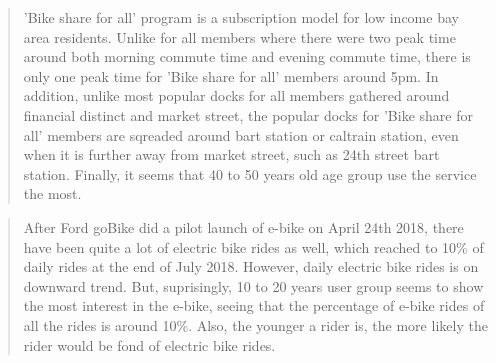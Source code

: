 \documentclass[11pt]{article}
\begin{document}
    \begin{quote}
'Bike share for all' program is a subscription model for low income bay
area residents. Unlike for all members where there were two peak time
around both morning commute time and evening commute time, there is only
one peak time for 'Bike share for all' members around 5pm. In addition,
unlike most popular docks for all members gathered around financial
distinct and market street, the popular docks for 'Bike share for all'
members are sqreaded around bart station or caltrain station, even when
it is further away from market street, such as 24th street bart station.
Finally, it seems that 40 to 50 years old age group use the service the
most.
\end{quote}

    \begin{quote}
After Ford goBike did a pilot launch of e-bike on April 24th 2018, there
have been quite a lot of electric bike rides as well, which reached to
10\% of daily rides at the end of July 2018. However, daily electric
bike rides is on downward trend. But, suprisingly, 10 to 20 years user
group seems to show the most interest in the e-bike, seeing that the
percentage of e-bike rides of all the rides is around 10\%. Also, the
younger a rider is, the more likely the rider would be fond of electric
bike rides.
\end{quote}


    
    
    
    
\end{document}
